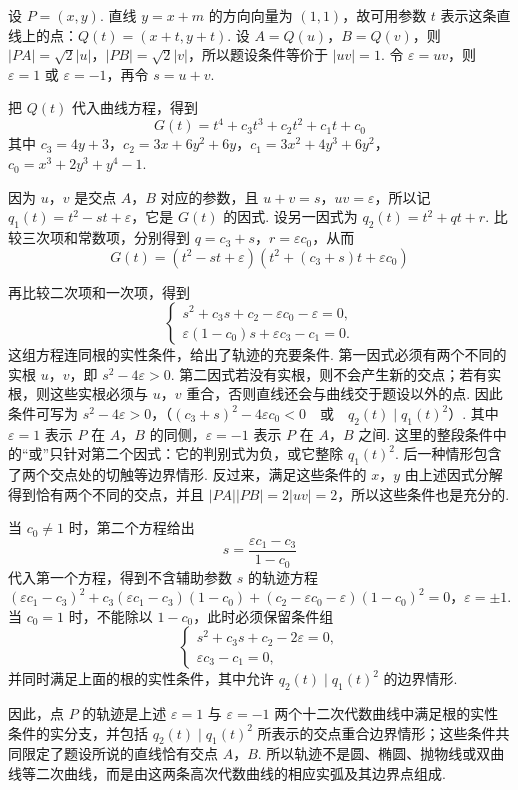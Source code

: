 \begin{solution}
设 \(P=(x,y)\). 直线 \(y=x+m\) 的方向向量为 \((1,1)\)，故可用参数 \(t\) 表示这条直线上的点：\(Q(t)=(x+t,y+t)\). 设 \(A=Q(u)\)，\(B=Q(v)\)，则 \(\left|PA\right|=\sqrt{2}\left|u\right|\)，\(\left|PB\right|=\sqrt{2}\left|v\right|\)，所以题设条件等价于 \(\left|uv\right|=1\). 令 \(\varepsilon=uv\)，则 \(\varepsilon=1\) 或 \(\varepsilon=-1\)，再令 \(s=u+v\).

把 \(Q(t)\) 代入曲线方程，得到
\[
G(t)=t^4+c_3t^3+c_2t^2+c_1t+c_0
\]
其中 \(c_3=4y+3\)，\(c_2=3x+6y^2+6y\)，\(c_1=3x^2+4y^3+6y^2\)，\(c_0=x^3+2y^3+y^4-1\).

因为 \(u\)，\(v\) 是交点 \(A\)，\(B\) 对应的参数，且 \(u+v=s\)，\(uv=\varepsilon\)，所以记 \(q_1(t)=t^2-st+\varepsilon\)，它是 \(G(t)\) 的因式. 设另一因式为 \(q_2(t)=t^2+qt+r\). 比较三次项和常数项，分别得到 \(q=c_3+s\)，\(r=\varepsilon c_0\)，从而
\[
G(t)=\left(t^2-st+\varepsilon\right)\left(t^2+(c_3+s)t+\varepsilon c_0\right)
\]

再比较二次项和一次项，得到
\[
\begin{cases}
s^2+c_3s+c_2-\varepsilon c_0-\varepsilon=0,\\
\varepsilon(1-c_0)s+\varepsilon c_3-c_1=0.
\end{cases}
\]
这组方程连同根的实性条件，给出了轨迹的充要条件. 第一因式必须有两个不同的实根 \(u\)，\(v\)，即 \(s^2-4\varepsilon>0\). 第二因式若没有实根，则不会产生新的交点；若有实根，则这些实根必须与 \(u\)，\(v\) 重合，否则直线还会与曲线交于题设以外的点. 因此条件可写为
\(s^2-4\varepsilon>0\)，（\((c_3+s)^2-4\varepsilon c_0<0\quad\text{或}\quad q_2(t)\mid q_1(t)^2\)）.
其中 \(\varepsilon=1\) 表示 \(P\) 在 \(A\)，\(B\) 的同侧，\(\varepsilon=-1\) 表示 \(P\) 在 \(A\)，\(B\) 之间. 这里的整段条件中的“或”只针对第二个因式：它的判别式为负，或它整除 \(q_1(t)^2\). 后一种情形包含了两个交点处的切触等边界情形. 反过来，满足这些条件的 \(x\)，\(y\) 由上述因式分解得到恰有两个不同的交点，并且 \(\left|PA\right|\left|PB\right|=2\left|uv\right|=2\)，所以这些条件也是充分的.

当 \(c_0\neq1\) 时，第二个方程给出
\[
s=\frac{\varepsilon c_1-c_3}{1-c_0}
\]
代入第一个方程，得到不含辅助参数 \(s\) 的轨迹方程
\(\left(\varepsilon c_1-c_3\right)^2+c_3\left(\varepsilon c_1-c_3\right)\left(1-c_0\right)+\left(c_2-\varepsilon c_0-\varepsilon\right)\left(1-c_0\right)^2=0\)，\(\varepsilon=\pm1\).
当 \(c_0=1\) 时，不能除以 \(1-c_0\)，此时必须保留条件组
\[
\begin{cases}
s^2+c_3s+c_2-2\varepsilon=0,\\
\varepsilon c_3-c_1=0,
\end{cases}
\]
并同时满足上面的根的实性条件，其中允许 \(q_2(t)\mid q_1(t)^2\) 的边界情形.

因此，点 \(P\) 的轨迹是上述 \(\varepsilon=1\) 与 \(\varepsilon=-1\) 两个十二次代数曲线中满足根的实性条件的实分支，并包括 \(q_2(t)\mid q_1(t)^2\) 所表示的交点重合边界情形；这些条件共同限定了题设所说的直线恰有交点 \(A\)，\(B\). 所以轨迹不是圆、椭圆、抛物线或双曲线等二次曲线，而是由这两条高次代数曲线的相应实弧及其边界点组成.
\end{solution}
